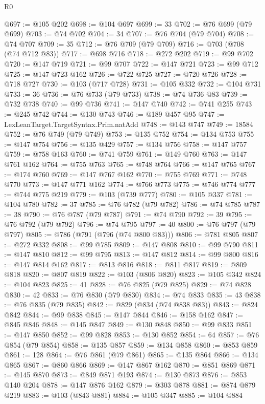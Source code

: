 \begin{lexlean}{R0}
\begin{coremodule}
@697 := @105 @202
@698 := @104 @697
@699 := 33
@702 := @76 @699 (@79 @699)
@703 := @74 @702
@704 := 34
@707 := @76 @704 (@79 @704)
@708 := @74 @707
@709 := 35
@712 := @76 @709 (@79 @709)
@716 := @703 (@708 (@74 @712 @83))
@717 := @698 @716
@718 := @272 @202
@719 := @99 @702
@720 := @147 @719
@721 := @99 @707
@722 := @147 @721
@723 := @99 @712
@725 := @147 @723 @162
@726 := @722 @725
@727 := @720 @726
@728 := @718 @727
@730 := @103 (@717 @728)
@731 := @105 @332
@732 := @104 @731
@733 := 36
@736 := @76 @733 (@79 @733)
@738 := @74 @736 @83
@739 := @732 @738
@740 := @99 @736
@741 := @147 @740
@742 := @741 @255
@743 := @245 @742
@744 := @130 @743
@746 := @189 @457 @95
@747 := LexLeanTarget.TargetSyntax.Prim.natAdd
@748 := @143 @747
@749 := 18584
@752 := @76 @749 (@79 @749)
@753 := @135 @752
@754 := @134 @753
@755 := @147 @754
@756 := @135 @429
@757 := @134 @756
@758 := @147 @757
@759 := @758 @163
@760 := @741 @759
@761 := @149 @760
@763 := @147 @761 @162
@764 := @755 @763
@765 := @748 @764
@766 := @147 @765
@767 := @174 @760
@769 := @147 @767 @162
@770 := @755 @769
@771 := @748 @770
@773 := @147 @771 @162
@774 := @766 @773
@775 := @746 @774
@777 := @744 @775 @219
@779 := @103 (@739 @777)
@780 := @105 @337
@781 := @104 @780
@782 := 37
@785 := @76 @782 (@79 @782)
@786 := @74 @785
@787 := 38
@790 := @76 @787 (@79 @787)
@791 := @74 @790
@792 := 39
@795 := @76 @792 (@79 @792)
@796 := @74 @795
@797 := 40
@800 := @76 @797 (@79 @797)
@805 := @786 (@791 (@796 (@74 @800 @83)))
@806 := @781 @805
@807 := @272 @332
@808 := @99 @785
@809 := @147 @808
@810 := @99 @790
@811 := @147 @810
@812 := @99 @795
@813 := @147 @812
@814 := @99 @800
@816 := @147 @814 @162
@817 := @813 @816
@818 := @811 @817
@819 := @809 @818
@820 := @807 @819
@822 := @103 (@806 @820)
@823 := @105 @342
@824 := @104 @823
@825 := 41
@828 := @76 @825 (@79 @825)
@829 := @74 @828
@830 := 42
@833 := @76 @830 (@79 @830)
@834 := @74 @833
@835 := 43
@838 := @76 @835 (@79 @835)
@842 := @829 (@834 (@74 @838 @83))
@843 := @824 @842
@844 := @99 @838
@845 := @147 @844
@846 := @158 @162
@847 := @845 @846
@848 := @145 @847
@849 := @130 @848
@850 := @99 @833
@851 := @147 @850
@852 := @99 @828
@853 := @130 @852
@854 := 64
@857 := @76 @854 (@79 @854)
@858 := @135 @857
@859 := @134 @858
@860 := @853 @859
@861 := 128
@864 := @76 @861 (@79 @861)
@865 := @135 @864
@866 := @134 @865
@867 := @860 @866
@869 := @147 @867 @162
@870 := @851 @869
@871 := @145 @870
@873 := @849 @871 @193
@874 := @130 @873
@876 := @853 @140 @204
@878 := @147 @876 @162
@879 := @303 @878
@881 := @874 @879 @219
@883 := @103 (@843 @881)
@884 := @105 @347
@885 := @104 @884

\end{coremodule}
\end{lexlean}
